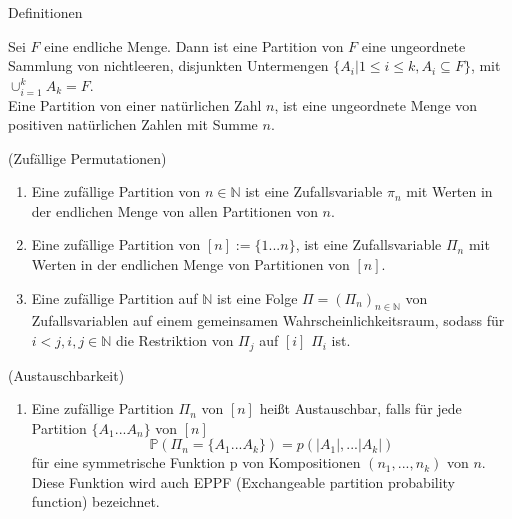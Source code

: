 \begin{section}{Definitionen}
\begin{Definition}
   Sei $F$ eine endliche Menge. Dann ist eine Partition von $F$ eine ungeordnete Sammlung von nichtleeren, disjunkten Untermengen $\{A_i| 1 \leq i \leq k, A_i \subseteq F\}$, mit $\cup_{i=1}^{k}A_k = F$.\\
   Eine Partition von einer natürlichen Zahl $n$, ist eine ungeordnete Menge von positiven natürlichen Zahlen mit Summe $n$.
\end{Definition}
\begin{Definition}
    \textnormal{(Zufällige Permutationen)}
\begin{enumerate}
    \item Eine zufällige Partition von $n\in \mathbb{N}$ ist eine Zufallsvariable $\pi_n$ mit Werten in der endlichen Menge von allen Partitionen von $n$.
    \item Eine zufällige Partition von $[n] := \{1 ...n\}$, ist eine Zufallsvariable $\Pi_n$ mit Werten in der endlichen Menge von Partitionen von $[n]$.
    \item Eine zufällige Partition auf $\mathbb{N}$ ist eine Folge $\Pi = (\Pi_n)_{n\in \mathbb{N}}$ von Zufallsvariablen auf einem gemeinsamen Wahrscheinlichkeitsraum, sodass für $i<j, i,j \in \mathbb{N}$ die Restriktion von $\Pi_j$ auf $[i]$ $\Pi_i$ ist.
\end{enumerate}

\end{Definition}
\begin{Definition}
    \textnormal{(Austauschbarkeit)}
    \begin{enumerate}
        \item Eine zufällige Partition $\Pi_n$ von $[n]$ heißt Austauschbar, falls für jede Partition $\{ A_1 ... A_n\}$ von $[n]$
        \[ 
            \mathbb{P}(\Pi_n = \{ A_1 ... A_k\}) = p(|A_1|, ... |A_k|)
        \]  
        für eine symmetrische Funktion p von Kompositionen $(n_1, ..., n_k)$ von $n$. Diese Funktion wird auch EPPF (Exchangeable partition probability function) bezeichnet.

    \end{enumerate}
\end{Definition}

\end{section}